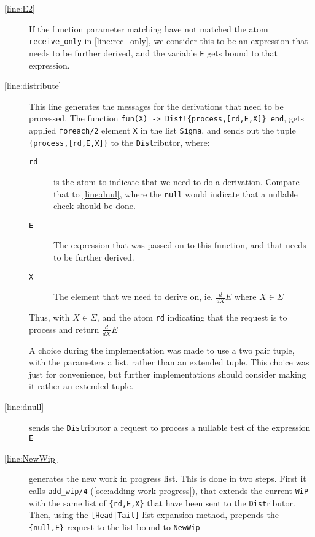 \begin{description}
\item[\autoref{line:E2}] If the function parameter matching have not
  matched the atom \texttt{receive\_only} in \autoref{line:rec_only},
  we consider this to be an expression that needs to be further
  derived, and the variable \texttt{E} gets bound to that expression.
\item[\autoref{line:distribute}] This line generates
  the messages for the derivations that need to be processed. The function
  \lstinline|fun(X) -> Dist!{process,[rd,E,X]} end|, gets applied
  \texttt{foreach/2} element \texttt{X} in the list \texttt{Sigma}, and sends out the tuple
  \texttt{\{process,[rd,E,X]\}} to the \texttt{Dist}ributor, where:
  \begin{description}
  \item[\texttt{rd}] is the atom to indicate that we need to do a
    derivation. Compare that to \autoref{line:dnul}, where the
    \texttt{null} would indicate that a nullable check should be done.
  \item[\texttt{E}] The expression that was passed on to this
    function, and that needs to be further derived.
  \item[\texttt{X}] The element that we need to derive on,
    ie. $\frac{d}{dX}E$ where $X\in \Sigma$
  \end{description}
 Thus, with $X\in \Sigma$, and the atom
  \texttt{rd} indicating that the request is to process and return $\frac{d}{dX}E$

  A choice during the implementation was made to use a two pair tuple,
  with the parameters a list, rather than an extended tuple. This
  choice was just for convenience, but further implementations should
  consider making it rather an extended tuple.
\item[\autoref{line:dnull}] sends the \texttt{Dist}ributor a request to
  process a nullable test of the expression \texttt{E}
\item[\autoref{line:NewWip}] generates the new work in progress
  list. This is done in two steps. First it calls \texttt{add\_wip/4}
  (\autoref{sec:adding-work-progress}), that extends the current
  \texttt{WiP} with the same list of \texttt{\{rd,E,X\}} that have
  been sent to the \texttt{Dist}ributor. Then, using the
  \texttt{[Head|Tail]} list expansion method, prepends the
  \texttt{\{null,E\}} request to the list bound to \texttt{NewWip}
\end{description}

